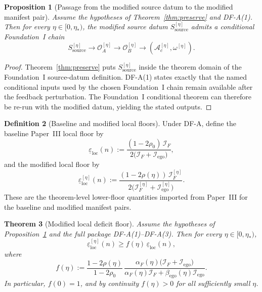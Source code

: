 \documentclass[12pt]{article}
\newtheorem{theorem}{Theorem}[section]
\newtheorem{proposition}[theorem]{Proposition}
\theoremstyle{definition}
\newtheorem{definition}[theorem]{Definition}
\theoremstyle{remark}
\begin{document}
\begin{proposition}[Passage from the modified source datum to the modified manifest pair]
\label{prop:chain}
Assume the hypotheses of Theorem~\ref{thm:preserve} and DF-A(1). Then
for every \(\eta\in[0,\eta_*)\), the modified source datum
\(S_{\mathrm{source}}^{[\eta]}\) admits a conditional Foundation~I chain
\[
S_{\mathrm{source}}^{[\eta]}
\to
\mathcal O_A^{[\eta]}
\to
\mathcal O_B^{[\eta]}
\to
(\mathcal A_c^{[\eta]},\omega^{[\eta]}).
\]
\end{proposition}

\begin{proof}
Theorem~\ref{thm:preserve} puts
\(S_{\mathrm{source}}^{[\eta]}\) inside the theorem domain of the
Foundation~I source-datum definition. DF-A(1) states exactly that the
named conditional inputs used by the chosen Foundation~I chain remain
available after the feedback perturbation. The Foundation~I conditional
theorem can therefore be re-run with the modified datum, yielding the
stated outputs.
\end{proof}

\begin{definition}[Baseline and modified local floors]
\label{def:floor}
Under DF-A, define the baseline Paper~III local floor by
\[
\underline{\varepsilon}_{\mathrm{loc}}(n)
:=
\frac{(1-2\rho_0)\,\mathcal I_F}
{2\bigl(\mathcal I_F+\mathcal I_{\mathrm{ego}}\bigr)},
\]
and the modified local floor by
\[
\underline{\varepsilon}_{\mathrm{loc}}^{[\eta]}(n)
:=
\frac{(1-2\rho(\eta))\,\mathcal I_F^{[\eta]}}
{2\bigl(\mathcal I_F^{[\eta]}+\mathcal I_{\mathrm{ego}}^{[\eta]}\bigr)}.
\]
These are the theorem-level lower-floor quantities imported from
Paper~III for the baseline and modified manifest pairs.
\end{definition}

\begin{theorem}[Modified local deficit floor]\label{thm:deficit}
Assume the hypotheses of Proposition~\ref{prop:chain} and the full
package DF-A(1)--DF-A(3). Then for every \(\eta\in[0,\eta_*)\),
\[
\underline{\varepsilon}_{\mathrm{loc}}^{[\eta]}(n)
\ge
f(\eta)\,
\underline{\varepsilon}_{\mathrm{loc}}(n),
\]
where
\[
f(\eta)
:=
\frac{1-2\rho(\eta)}{1-2\rho_0}\,
\frac{\alpha_F(\eta)
\bigl(\mathcal I_F+\mathcal I_{\mathrm{ego}}\bigr)}
{\alpha_F(\eta)\mathcal I_F
+\beta_{\mathrm{ego}}(\eta)\mathcal I_{\mathrm{ego}}}.
\]
In particular, \(f(0)=1\), and by continuity \(f(\eta)>0\) for all
sufficiently small \(\eta\).
\end{theorem}
\end{document}
